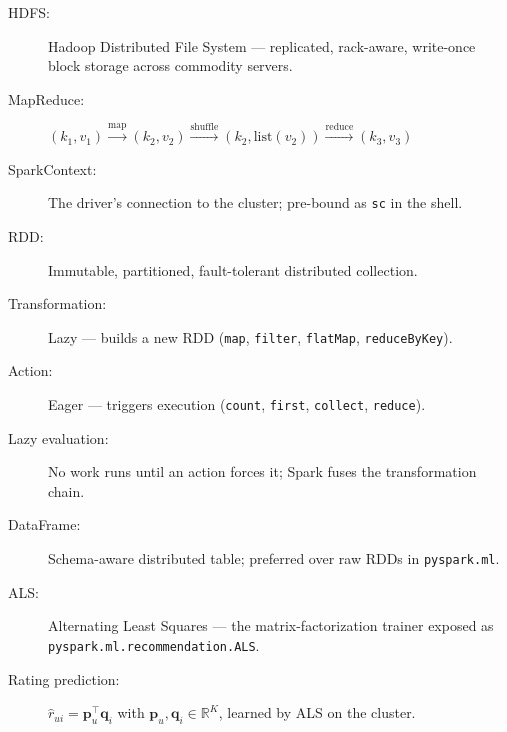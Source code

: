 \documentclass[11pt]{article}
\begin{document}
\begin{description}
    \item[HDFS:] Hadoop Distributed File System --- replicated, rack-aware, write-once block storage across commodity servers.
    \item[MapReduce:] $(k_1, v_1) \xrightarrow{\text{map}} (k_2, v_2) \xrightarrow{\text{shuffle}} (k_2, \text{list}(v_2)) \xrightarrow{\text{reduce}} (k_3, v_3)$
    \item[SparkContext:] The driver's connection to the cluster; pre-bound as \texttt{sc} in the shell.
    \item[RDD:] Immutable, partitioned, fault-tolerant distributed collection.
    \item[Transformation:] Lazy --- builds a new RDD (\texttt{map}, \texttt{filter}, \texttt{flatMap}, \texttt{reduceByKey}).
    \item[Action:] Eager --- triggers execution (\texttt{count}, \texttt{first}, \texttt{collect}, \texttt{reduce}).
    \item[Lazy evaluation:] No work runs until an action forces it; Spark fuses the transformation chain.
    \item[DataFrame:] Schema-aware distributed table; preferred over raw RDDs in \texttt{pyspark.ml}.
    \item[ALS:] Alternating Least Squares --- the matrix-factorization trainer exposed as \texttt{pyspark.ml.recommendation.ALS}.
    \item[Rating prediction:] \( \hat{r}_{ui} = \mathbf{p}_u^{\top}\mathbf{q}_i \) with $\mathbf{p}_u, \mathbf{q}_i \in \mathbb{R}^{K}$, learned by ALS on the cluster.
\end{description}
\end{document}
